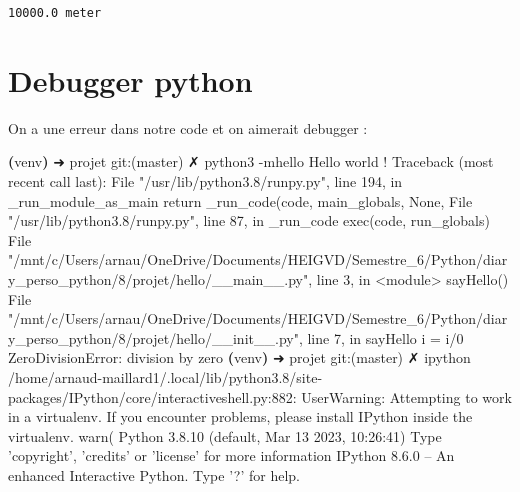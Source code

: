 \documentclass[11pt]{article}
\newenvironment{Shaded}{}{}
\newcommand{\KeywordTok}[1]{\textcolor[rgb]{0.00,0.44,0.13}{\textbf{{#1}}}}
\newcommand{\StringTok}[1]{\textcolor[rgb]{0.25,0.44,0.63}{{#1}}}
\newcommand{\FunctionTok}[1]{\textcolor[rgb]{0.02,0.16,0.49}{{#1}}}
\newcommand{\NormalTok}[1]{{#1}}
\newcommand{\OperatorTok}[1]{\textcolor[rgb]{0.40,0.40,0.40}{{#1}}}
\newcommand{\BuiltInTok}[1]{{#1}}
\newcommand{\ExtensionTok}[1]{{#1}}
\begin{document}
    \begin{Verbatim}[commandchars=\\\{\}]
10000.0 meter
    \end{Verbatim}

    \hypertarget{debugger-python}{%
\section{Debugger python}\label{debugger-python}}

On a une erreur dans notre code et on aimerait debugger :

\begin{Shaded}
\begin{Highlighting}[]
\KeywordTok{(}\ExtensionTok{venv}\KeywordTok{)}\NormalTok{ ➜  }\ExtensionTok{projet}\NormalTok{ git:(master) ✗ }\ExtensionTok{python3}\NormalTok{ -mhello}
\ExtensionTok{Hello}\NormalTok{ world !}
\ExtensionTok{Traceback}\NormalTok{ (most recent call last)}\BuiltInTok{:}
  \ExtensionTok{File} \StringTok{"/usr/lib/python3.8/runpy.py"}\NormalTok{, line 194, in _run_module_as_main}
    \BuiltInTok{return}\NormalTok{ _run_code(code, main_globals, None,}
  \ExtensionTok{File} \StringTok{"/usr/lib/python3.8/runpy.py"}\NormalTok{, line 87, in _run_code}
    \BuiltInTok{exec}\NormalTok{(code, run_globals)}
  \ExtensionTok{File} \StringTok{"/mnt/c/Users/arnau/OneDrive/Documents/HEIGVD/Semestre_6/Python/diary_perso_python/8/projet/hello/__main__.py"}\NormalTok{, line 3, in }\OperatorTok{<}\NormalTok{module}\OperatorTok{>}
    \FunctionTok{sayHello()}
  \ExtensionTok{File} \StringTok{"/mnt/c/Users/arnau/OneDrive/Documents/HEIGVD/Semestre_6/Python/diary_perso_python/8/projet/hello/__init__.py"}\NormalTok{, line 7, in sayHello}
    \ExtensionTok{i}\NormalTok{ = i/0}
\ExtensionTok{ZeroDivisionError}\NormalTok{: division by zero}
\KeywordTok{(}\ExtensionTok{venv}\KeywordTok{)}\NormalTok{ ➜  }\ExtensionTok{projet}\NormalTok{ git:(master) ✗ }\ExtensionTok{ipython}
\ExtensionTok{/home/arnaud-maillard1/.local/lib/python3.8/site-packages/IPython/core}\NormalTok{/interactiveshell.py:}\ExtensionTok{882}\NormalTok{: UserWarning: Attempting to work in a virtualenv. If you encounter problems, please install IPython inside the virtualenv.}
  \ExtensionTok{warn}\NormalTok{(}
\ExtensionTok{Python}\NormalTok{ 3.8.10 (default, Mar 13 2023, 10:26:41)}
\ExtensionTok{Type} \StringTok{'copyright'}\NormalTok{, }\StringTok{'credits'}\NormalTok{ or }\StringTok{'license'}\NormalTok{ for more information}
\ExtensionTok{IPython}\NormalTok{ 8.6.0 -- An enhanced Interactive Python. Type }\StringTok{'?'}\NormalTok{ for help.}


\end{Highlighting}
\end{Shaded}
\end{document}
